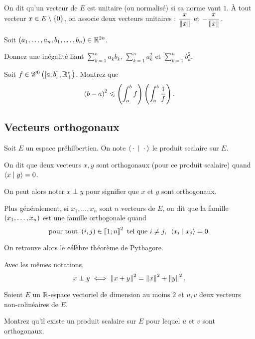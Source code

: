 On dit qu'un vecteur de \(E\) est unitaire (ou normalisé) si sa norme vaut \(1\). À tout vecteur \(x\in E\setminus\left\lbrace0\right\rbrace\), on associe deux vecteurs unitaires : \(\dfrac{x}{\norme{x}}\) et \(-\dfrac{x}{\norme{x}}\).

\begin{exo}
Soit \(\left(a_1,\dots,a_n,b_1,\dots,b_n\right)\in\mathbb{R}^{2n}\).

Donnez une inégalité liant \(\sum_{k=1}^na_kb_k\), \(\sum_{k=1}^na_k^2\) et \(\sum_{k=1}^nb_k^2\).
\end{exo}

\begin{exo}
Soit \(f\in\mathscr{C}^{0}\left(\left[a;b\right],\mathbb{R}_+^*\right)\). Montrez que \[\left(b-a\right)^2\leqslant\left(\int_a^bf\right)\left(\int_a^b\dfrac{1}{f}\right).\]
\end{exo}

\subsection{Vecteurs orthogonaux}

\begin{defi}
Soit \(E\) un espace préhilbertien. On note \(\ps{}{}\) le produit scalaire sur \(E\).

On dit que deux vecteurs \(x,y\) sont orthogonaux (pour ce produit scalaire) quand \(\ps{x}{y}=0\).

On peut alors noter \(x\perp y\) pour signifier que \(x\) et \(y\) sont orthogonaux.

Plus généralement, si \(x_1,\dots,x_n\) sont \(n\) vecteurs de \(E\), on dit que la famille \(\left(x_1,\dots,x_n\right)\) est une famille orthogonale quand \[\quantifs{\tpt\paren{i,j}\in\interventierii{1}{n}^2\text{ tel que }i\not=j}\ps{x_i}{x_j}=0.\]
\end{defi}

On retrouve alors le célèbre théorème de Pythagore.

\begin{prop}
Avec les mêmes notations, \[x\perp y\ssi\norme{x+y}^2=\norme{x}^2+\norme{y}^2.\]
\end{prop}

\begin{exo}
Soient \(E\) un \(\mathbb{R}\)-espace vectoriel de dimension au moins \(2\) et \(u,v\) deux vecteurs non-colinéaires de \(E\).

Montrez qu'il existe un produit scalaire sur \(E\) pour lequel \(u\) et \(v\) sont orthogonaux.
\end{exo}

